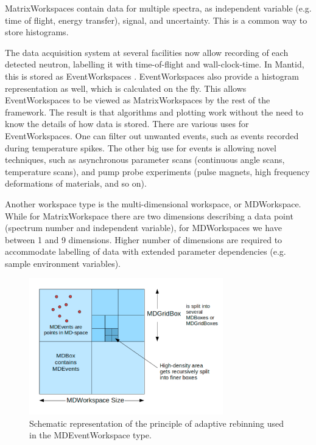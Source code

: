 \documentclass[1p]{elsarticle}
\begin{document}
MatrixWorkspaces contain data for multiple spectra, as independent variable (e.g. time of flight, energy transfer), signal, and uncertainty. This is a common way to store histograms. 

The data acquisition system at several facilities now allow recording of each  detected neutron, labelling it with time-of-flight and wall-clock-time. In Mantid, this is stored as EventWorkspaces \cite{EventPaper}. 
EventWorkspaces also provide a histogram representation as well, which is calculated on the fly. This allows EventWorkspaces to be viewed as MatrixWorkspaces by the rest of the framework. The result is that algorithms and plotting work without the need to know the details of how data is stored. 
There are various uses for EventWorkspaces. One can filter out unwanted events, such as events recorded during temperature spikes. The other big use for events is allowing novel techniques, such as asynchronous parameter scans (continuous angle scans, temperature scans), and pump probe experiments (pulse magnets, high frequency deformations of materials, and so on).
 
Another workspace type is the multi-dimensional workspace, or MDWorkspace. While for MatrixWorkspace there are two dimensions describing a data point (spectrum number and independent variable), for MDWorkspaces we have between 1 and 9 dimensions. Higher number of dimensions are required to accommodate labelling of data with extended parameter dependencies (e.g. sample environment variables). 

\begin{figure}[!ht]
\centerline{\includegraphics[width=0.75\textwidth]{MDEvents.pdf}}
\caption{Schematic representation of the principle of adaptive rebinning used in the MDEventWorkspace type.}
\label{mdevent}
\end{figure}
\end{document}
